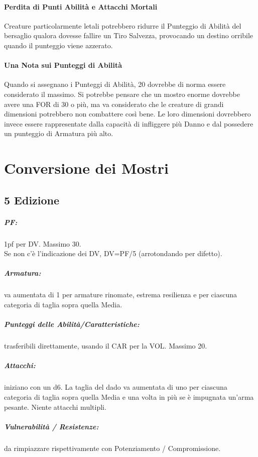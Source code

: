 \documentclass[itdr]{subfiles}
\begin{document}
\vfill
{}

\paragraph{Perdita di Punti Abilità e Attacchi Mortali}
Creature particolarmente letali potrebbero ridurre il Punteggio di Abilità del bersaglio qualora dovesse fallire un Tiro Salvezza, provocando un destino orribile quando il punteggio viene azzerato.

\vfill
{}
\paragraph{Una Nota sui Punteggi di Abilità}
Quando si assegnano i Punteggi di Abilità, 20 dovrebbe di norma essere considerato il massimo. Si potrebbe pensare che un mostro enorme dovrebbe avere una FOR di 30 o più, ma va considerato che le creature di grandi dimensioni potrebbero non combattere così bene. Le loro dimensioni dovrebbero invece essere rappresentate dalla capacità di infliggere più Danno e dal possedere un punteggio di Armatura più alto.

\vfill
\break

\section{Conversione dei Mostri}

\subsection*{5 Edizione}

\subparagraph{PF:} 1pf per DV. Massimo 30.\\Se non c'è l'indicazione dei DV, DV=PF/5 (arrotondando per difetto).
\subparagraph{Armatura:} va aumentata di 1 per armature rinomate, estrema resilienza e per ciascuna categoria di taglia sopra quella Media.
\subparagraph{Punteggi delle Abilità/Caratteristiche:} trasferibili direttamente, usando il CAR per la VOL. Massimo 20.
\subparagraph{Attacchi:} iniziano con un d6. La taglia del dado va aumentata di uno per ciascuna categoria di taglia sopra quella Media e una volta in più se è impugnata un'arma pesante. Niente attacchi multipli.
\subparagraph{Vulnerabilità / Resistenze:} da rimpiazzare rispettivamente con Potenziamento / Compromissione.

\vfill
\end{document}
